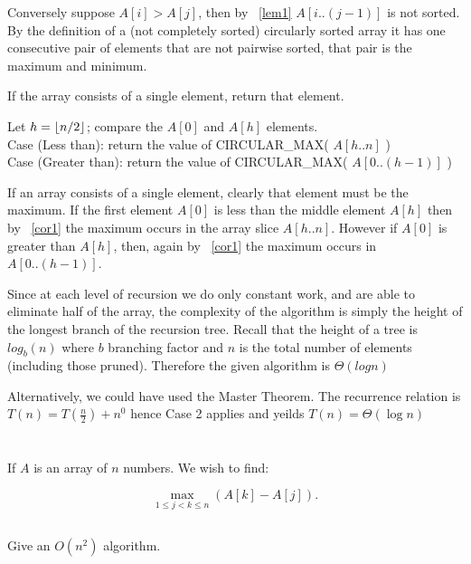 \documentclass{amsart}
\theoremstyle{definition}
\theoremstyle{remark}
\numberwithin{equation}{section}
\DeclarePairedDelimiter{\floor}{\lfloor}{\rfloor}
\begin{document}
Conversely suppose $A[i] > A[j]$, then by ~\ref{lem1} $A[i..(j-1)]$ is
not sorted. By the definition of a (not completely sorted) circularly
sorted array it has one consecutive pair of elements that are not
pairwise sorted, that pair is the maximum and minimum.


If the array consists of a single element, return that element.

Let $h = \floor{n/2}$; compare the $A[0]$ and $A[h]$ elements. \\

Case (Less than): return the value of CIRCULAR\_MAX( $A[h..n]$ ) \\

Case (Greater than): return the value of CIRCULAR\_MAX( $A[0..(h-1)]$ ) \\

\proof

If an array consists of a single element, clearly that element must
be the maximum. If the first element $A[0]$ is less than the middle
element $A[h]$ then by ~\ref{cor1} the maximum occurs in the array slice
$A[h..n]$. However if $A[0]$ is greater than $A[h]$, then, again by
~\ref{cor1} the maximum occurs in $A[0..(h-1)]$.


\proof

Since at each level of recursion we do only constant work, and are able
to eliminate half of the array, the complexity of the algorithm is
simply the height of the longest branch of the recursion tree. Recall
that the height of a tree is $log_{b} (n)$ where $b$ branching factor
and $n$ is the total number of elements (including those pruned).
Therefore the given algorithm is $\Theta( log n )$

Alternatively, we could have used the Master Theorem. The recurrence
relation is $T(n) = T(\frac{n}{2}) + n^0$ hence Case 2 applies and
yeilds $T(n) = \Theta (\log n)$
\\


\section{} If $A$ is an array of $n$ numbers. We wish to find:

$$ \max_{1 \leq j<k \leq n} (A[k] - A[j]).$$

\subsection{} Give an $O( n^2 )$ algorithm.
\end{document}
